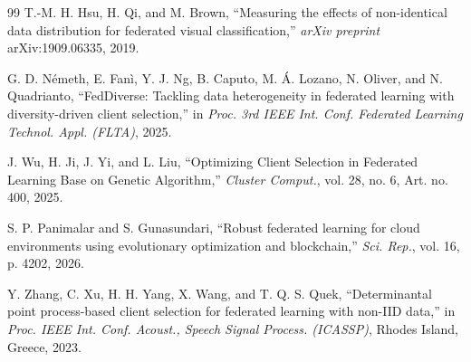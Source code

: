 \documentclass[conference]{IEEEtran}
\begin{document}
\begin{thebibliography}{99}
T.-M. H. Hsu, H. Qi, and M. Brown, ``Measuring the effects of non-identical data distribution for federated visual classification,'' \emph{arXiv preprint} arXiv:1909.06335, 2019.

G. D. N\'{e}meth, E. Fan\`{i}, Y. J. Ng, B. Caputo, M. \'{A}. Lozano, N. Oliver, and N. Quadrianto, ``FedDiverse: Tackling data heterogeneity in federated learning with diversity-driven client selection,'' in \emph{Proc. 3rd IEEE Int. Conf. Federated Learning Technol. Appl. (FLTA)}, 2025.

J. Wu, H. Ji, J. Yi, and L. Liu, ``Optimizing Client Selection in Federated Learning Base on Genetic Algorithm,'' \emph{Cluster Comput.}, vol. 28, no. 6, Art. no. 400, 2025.

S. P. Panimalar and S. Gunasundari, ``Robust federated learning for cloud environments using evolutionary optimization and blockchain,'' \emph{Sci. Rep.}, vol. 16, p. 4202, 2026.

Y. Zhang, C. Xu, H. H. Yang, X. Wang, and T. Q. S. Quek, ``Determinantal point process-based client selection for federated learning with non-IID data,'' in \emph{Proc. IEEE Int. Conf. Acoust., Speech Signal Process. (ICASSP)}, Rhodes Island, Greece, 2023.

\end{thebibliography}
\end{document}
